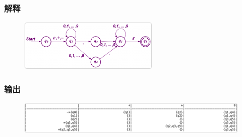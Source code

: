 \documentclass[lang=cn,11pt,a4paper,cite=authornum]{paper}
\begin{document}
\subsubsection{解释}

\begin{figure}[htbp]

    \centering\includegraphics[width=0.6\textwidth]{./Images/img8.png}

\end{figure}

\subsubsection{输出}

\begin{figure}[htbp]

    \centering\includegraphics[width=\textwidth]{./Images/img9.png}

\end{figure}
\end{document}
